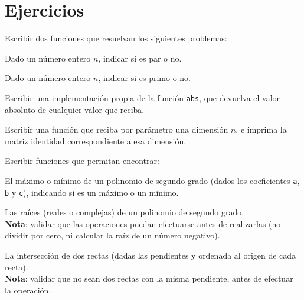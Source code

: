 \newpage
\section{Ejercicios}

\begin{ejercicio} Escribir dos funciones que resuelvan los siguientes problemas:
\begin{partes}
    \item Dado un número entero $n$, indicar si es par o no.
    \item Dado un número entero $n$, indicar si es primo o no.
\end{partes}
\end{ejercicio}

\begin{ejercicio}
Escribir una implementación propia de la función \verb!abs!, que devuelva
el valor absoluto de cualquier valor que reciba.
\end{ejercicio}

\begin{ejercicio}
Escribir una función que reciba por parámetro una dimensión $n$, e imprima
la matriz identidad correspondiente a esa dimensión.
\end{ejercicio}

\begin{ejercicio}
Escribir funciones que permitan encontrar:
\begin{partes}

    \item  El máximo o mínimo de un polinomio de segundo grado (dados los
coeficientes \verb!a!, \verb!b! y \verb!c!), indicando si es un máximo o un
mínimo.

    \item Las raíces (reales o complejas) de un polinomio de segundo grado. \\
{\bf Nota}: validar que las operaciones puedan efectuarse antes de
realizarlas (no dividir por cero, ni calcular la raíz de un número negativo).

    \item La intersección de dos rectas (dadas las pendientes y ordenada
 al origen de cada recta). \\
{\bf Nota}: validar que no sean dos rectas con la misma pendiente, antes de
efectuar la operación.
\end{partes}
\end{ejercicio}


